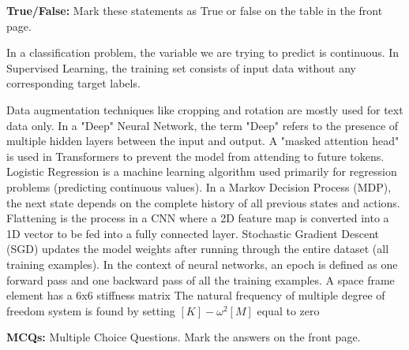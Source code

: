 \documentclass[12pt]{exam}
\begin{document}
	\begin{questions}
        \addpoints
        \begin{center}            
    \textbf{True/False:} Mark these statements as True or false on the table in the front page.
       \end{center}
            \question In a classification problem, the variable we are trying to predict is continuous. %
            \question In Supervised Learning, the training set consists of input data without any corresponding target labels. %

            \question Data augmentation techniques like cropping and rotation are mostly used for text data only. %
            \question In a "Deep" Neural Network, the term "Deep" refers to the presence of multiple hidden layers between the input and output. %
            \question A "masked attention head" is used in Transformers to prevent the model from attending to future tokens. %
            \question Logistic Regression is a machine learning algorithm used primarily for regression problems (predicting continuous values). %
            \question In a Markov Decision Process (MDP), the next state depends on the complete history of all previous states and actions. %
            \question Flattening is the process in a CNN where a 2D feature map is converted into a 1D vector to be fed into a fully connected layer. %
            \question Stochastic Gradient Descent (SGD) updates the model weights after running through the entire dataset (all training examples). %
            \question In the context of neural networks, an epoch is defined as one forward pass and one backward pass of all the training examples. %
            \question A space frame element has a 6x6 stiffness matrix %
            \question The natural frequency of multiple degree of freedom system is found by setting $[K]-\omega^2[M]$ equal to zero
    
		
		
		
        \end{questions}
			\begin{center} 

            \textbf{MCQs: }Multiple Choice Questions. Mark the answers on the front page. 
            \end{center}
\end{document}
